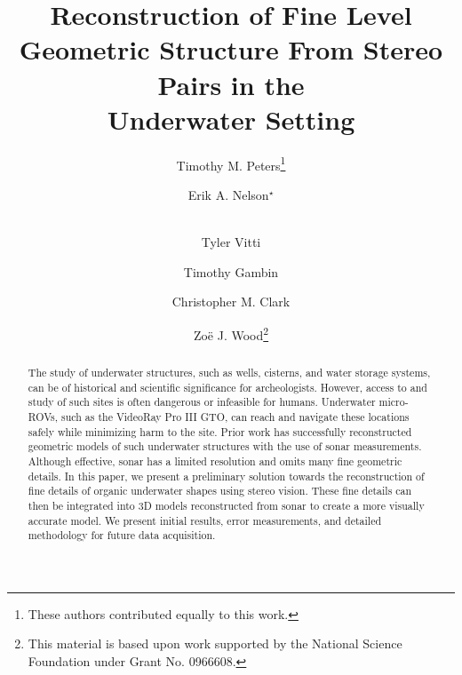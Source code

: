 \documentclass{llncs}
\begin{document}
\frontmatter          %
%
%
%
\pagestyle{headings}  %
%
%
\title{Reconstruction of Fine Level Geometric Structure From Stereo Pairs in the \\ Underwater Setting}
%
%
\author{Timothy M. Peters\thanks{These authors contributed equally to this work.} \and Erik A. Nelson$^{\star}$ \and \\
Tyler Vitti \and Timothy Gambin \and 
Christopher M. Clark \and Zo\"{e} J. Wood\thanks{This material
is based upon work supported by the National Science Foundation under Grant No.
0966608.}}
%
%
%
%
%
%
%
\maketitle              %

\begin{abstract}
The study of underwater structures, such as wells, cisterns, and water storage systems, can be of historical and scientific significance for archeologists. However, access to and study of such sites is often dangerous or infeasible for humans. Underwater micro-ROVs, such as the VideoRay Pro III GTO, can reach and navigate these locations safely while minimizing harm to the site. Prior work has successfully reconstructed geometric models of such underwater structures with the use of sonar measurements. Although effective, sonar has a limited resolution and omits many fine geometric details. In this paper, we present a preliminary solution towards the reconstruction of fine details of organic underwater shapes using stereo vision. These fine details can then be integrated into 3D models reconstructed from sonar to create a more visually accurate model. We present initial results, error measurements, and detailed methodology for future data acquisition.
\end{abstract}
%
\end{document}
